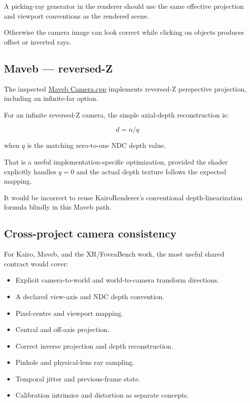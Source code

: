 A picking-ray generator in the renderer should use the same effective projection and viewport conventions as the rendered scene.

Otherwise the camera image can look correct while clicking on objects produces offset or inverted rays.

\subsection{Maveb --- reversed-Z}\label{02-foundations-ii-ch037-maveb-reversed-z}

The inspected \href{https://github.com/swayam8624/Maveb/blob/main/engine/scene/src/Camera.cpp?utm_source=chatgpt.com}{Maveb Camera.cpp} implements reversed-Z perspective projection, including an infinite-far option.

For an infinite reversed-Z camera, the simple axial-depth reconstruction is:

\[ \boxed{d=n/q} \]

when \(q\) is the matching zero-to-one NDC depth value.

That is a useful implementation-specific optimization, provided the shader explicitly handles \(q=0\) and the actual depth texture follows the expected mapping.

It would be incorrect to reuse KairoRenderer's conventional depth-linearization formula blindly in this Maveb path.

\subsection{Cross-project camera consistency}\label{02-foundations-ii-ch037-cross-project-camera-consistency}

For Kairo, Maveb, and the XR/FoveaBench work, the most useful shared contract would cover:

\begin{itemize}
\tightlist
\item
  Explicit camera-to-world and world-to-camera transform directions.
\item
  A declared view-axis and NDC depth convention.
\item
  Pixel-centre and viewport mapping.
\item
  Central and off-axis projection.
\item
  Correct inverse projection and depth reconstruction.
\item
  Pinhole and physical-lens ray sampling.
\item
  Temporal jitter and previous-frame state.
\item
  Calibration intrinsics and distortion as separate concepts.
\end{itemize}

